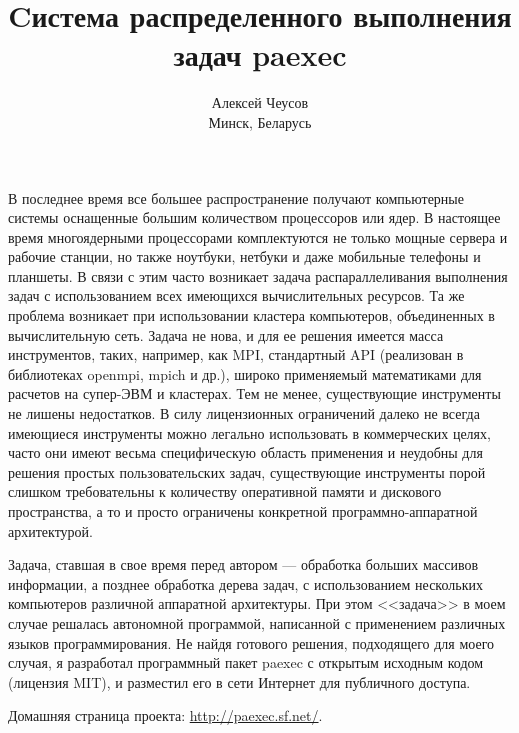 \documentclass[10pt, a5paper]{article}
\begin{document}
\title{Cистема распределенного выполнения задач paexec }
\author{Алексей Чеусов\\
\small Минск, Беларусь}
\def\progref!#1!{\texttt{#1}}

\maketitle
В последнее время все большее распространение получают компьютерные
системы оснащенные большим количеством процессоров или ядер.  В
настоящее время многоядерными процессорами комплектуются не только
мощные сервера и рабочие станции, но также ноутбуки, нетбуки и
даже мобильные телефоны и планшеты. В связи с этим часто возникает
задача распараллеливания выполнения задач с использованием всех
имеющихся вычислительных ресурсов. Та же проблема возникает при
использовании кластера компьютеров, объединенных в вычислительную
сеть. Задача не нова, и для ее решения имеется масса инструментов,
таких, например, как MPI, стандартный API (реализован в библиотеках
openmpi, mpich и др.), широко применяемый математиками для расчетов на
супер-ЭВМ и кластерах.  Тем не менее, существующие инструменты не
лишены недостатков.  В силу лицензионных ограничений далеко не всегда
имеющиеся инструменты можно легально использовать в коммерческих
целях, часто они имеют весьма специфическую область применения и
неудобны для решения простых пользовательских задач, существующие
инструменты порой слишком требовательны к количеству оперативной
памяти и дискового пространства, а то и просто ограничены конкретной
программно-аппаратной архитектурой.

Задача, ставшая в свое время перед автором --- обработка больших
массивов информации, а позднее обработка дерева задач, с
использованием нескольких компьютеров различной аппаратной
архитектуры. При этом <<задача>> в моем случае решалась автономной
программой, написанной с применением различных языков
программирования. Не найдя готового решения, подходящего для моего
случая, я разработал программный пакет paexec с открытым исходным
кодом (лицензия MIT), и разместил его в сети Интернет для публичного
доступа.

Домашняя страница проекта: \url{http://paexec.sf.net/}.
\end{document}
